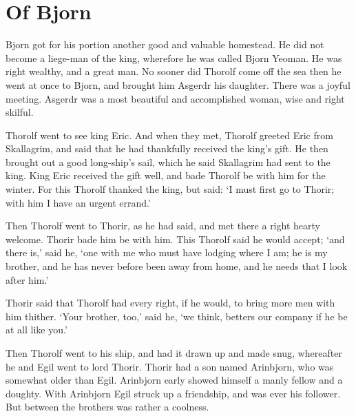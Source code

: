 \chapter{Of Bjorn}

Bjorn got for his portion another good and valuable homestead. He did not become a liege-man of the king, wherefore he was called Bjorn Yeoman. He was right wealthy, and a great man. No sooner did Thorolf come off the sea then he went at once to Bjorn, and brought him Asgerdr his daughter. There was a joyful meeting. Asgerdr was a most beautiful and accomplished woman, wise and right skilful.

Thorolf went to see king Eric. And when they met, Thorolf greeted Eric from Skallagrim, and said that he had thankfully received the king's gift. He then brought out a good long-ship's sail, which he said Skallagrim had sent to the king. King Eric received the gift well, and bade Thorolf be with him for the winter. For this Thorolf thanked the king, but said: `I must first go to Thorir; with him I have an urgent errand.'

Then Thorolf went to Thorir, as he had said, and met there a right hearty welcome. Thorir bade him be with him. This Thorolf said he would accept; `and there is,' said he, `one with me who must have lodging where I am; he is my brother, and he has never before been away from home, and he needs that I look after him.'

Thorir said that Thorolf had every right, if he would, to bring more men with him thither. `Your brother, too,' said he, `we think, betters our company if he be at all like you.'

Then Thorolf went to his ship, and had it drawn up and made snug, whereafter he and Egil went to lord Thorir. Thorir had a son named Arinbjorn, who was somewhat older than Egil. Arinbjorn early showed himself a manly fellow and a doughty. With Arinbjorn Egil struck up a friendship, and was ever his follower. But between the brothers was rather a coolness.
